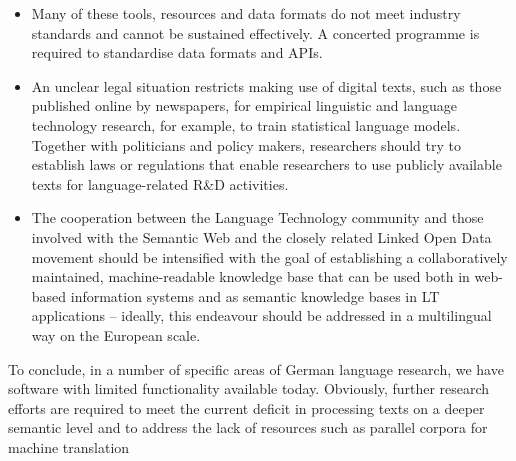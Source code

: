 \documentclass[]{../../metanetpaper}
\begin{document}
\begin{Parallel}[c]{80mm}{80mm}
{\begin{itemize}
      \item Many of these tools, resources and data formats do not meet industry standards and cannot be sustained effectively. A concerted programme is required to standardise data formats and APIs.
      \item An unclear legal situation restricts making use of digital texts, such as those published online by newspapers, for empirical linguistic and language technology research, for example, to train statistical language models. Together with politicians and policy makers, researchers should try to establish laws or regulations that enable researchers to use publicly available texts for language-related R\&D activities.
      \item The cooperation between the Language Technology community and those involved with the Semantic Web and the closely related Linked Open Data movement should be intensified with the goal of establishing a collaboratively maintained, machine-readable knowledge base that can be used both in web-based information systems and as semantic knowledge bases in LT applications – ideally, this endeavour should be addressed in a multilingual way on the European scale.
    \end{itemize}
    To conclude, in a number of specific areas of German language research, we have software with limited functionality available today. Obviously, further research efforts are required to meet the current deficit in processing texts on a deeper semantic level and to address the lack of resources such as parallel corpora for machine translation
  }
  
  \ParallelPar



\end{Parallel}
\end{document}

